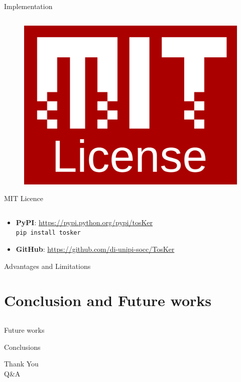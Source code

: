 \documentclass{beamer}
\begin{document}
\begin{frame}{Implementation}
\begin{columns}[b]
\begin{column}{.3\textwidth}
\begin{figure}
            \includegraphics[width=.6\textwidth]{img/mit.png}
          \end{figure}
          {\large MIT Licence}
      \end{column}
    \end{columns}
      \vspace{20pt}
      \begin{itemize}
        \item %
          \small\textbf{PyPI}: \href{https://pypi.python.org/pypi/tosKer}{https://pypi.python.org/pypi/tosKer}\\
          \indent\indent\texttt{pip install tosker}\vspace{10pt}
        \item %
          \small\textbf{GitHub}: \href{https://github.com/di-unipi-socc/TosKer}{https://github.com/di-unipi-socc/TosKer}
      \end{itemize}
  \end{frame}

  \begin{frame}{Advantages and Limitations}

  \end{frame}

\section{Conclusion and Future works}\subsection*{}

  \begin{frame}{Future works}

  \end{frame}

  \begin{frame}{Conclusions}

  \end{frame}

  \begin{frame}
    \centering
    \Huge Thank You \\
    \bigskip
    \LARGE Q\&A
  \end{frame}
\end{document}

